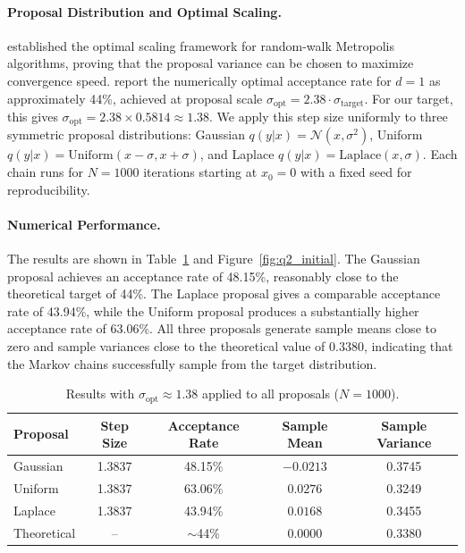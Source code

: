 \documentclass[a4paper,10pt]{article}
\theoremstyle{nonumberplain}
\theoremstyle{nonumberplain}
\theoremstyle{nonumberplain}
\theoremstyle{nonumberplain}
\begin{document}
\paragraph{Proposal Distribution and Optimal Scaling.} \cite{roberts1997} established the optimal scaling framework for random-walk Metropolis algorithms, proving that the proposal variance can be chosen to maximize convergence speed. \cite[Table~1]{gelman1996} report the numerically optimal acceptance rate for $d = 1$ as approximately 44\%, achieved at proposal scale $\sigma_{\text{opt}} = 2.38 \cdot \sigma_{\text{target}}$. For our target, this gives $\sigma_{\text{opt}} = 2.38 \times 0.5814 \approx 1.38$. We apply this step size uniformly to three symmetric proposal distributions: Gaussian $q(y|x) = \mathcal{N}(x, \sigma^2)$, Uniform $q(y|x) = \text{Uniform}(x - \sigma, x + \sigma)$, and Laplace $q(y|x) = \text{Laplace}(x, \sigma)$. Each chain runs for $N = 1000$ iterations starting at $x_0 = 0$ with a fixed seed for reproducibility.

\paragraph{Numerical Performance.} The results are shown in Table~\ref{tab:q2_initial} and Figure~\ref{fig:q2_initial}. The Gaussian proposal achieves an acceptance rate of 48.15\%, reasonably close to the theoretical target of 44\%. The Laplace proposal gives a comparable acceptance rate of 43.94\%, while the Uniform proposal produces a substantially higher acceptance rate of 63.06\%. All three proposals generate sample means close to zero and sample variances close to the theoretical value of 0.3380, indicating that the Markov chains successfully sample from the target distribution.
\begin{table}[hbt!]
\centering
\caption{Results with $\sigma_{\text{opt}} \approx 1.38$ applied to all proposals ($N = 1000$).}
\label{tab:q2_initial}
\begin{tabular}{lcccc}
\hline
\textbf{Proposal} & \textbf{Step Size} & \textbf{Acceptance Rate} & \textbf{Sample Mean} & \textbf{Sample Variance} \\
\hline
Gaussian & 1.3837 & 48.15\% & $-0.0213$ & 0.3745 \\
Uniform & 1.3837 & 63.06\% & $0.0276$ & 0.3249 \\
Laplace & 1.3837 & 43.94\% & $0.0168$ & 0.3455 \\
\hline
Theoretical & -- & $\sim$44\% & $0.0000$ & 0.3380 \\
\hline
\end{tabular}
\end{table}
\end{document}
